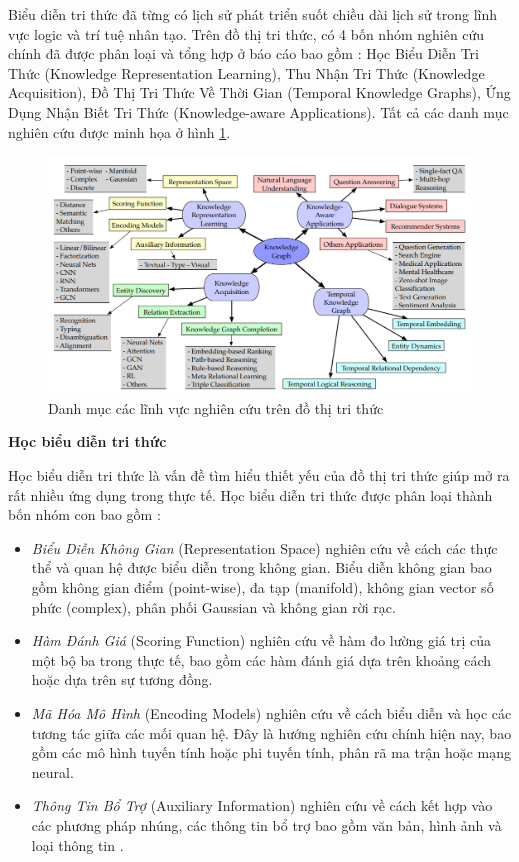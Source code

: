 Biểu diễn tri thức đã từng có lịch sử phát triển suốt chiều dài lịch sử trong lĩnh vực logic và trí tuệ nhân tạo. Trên đồ thị tri thức, có 4 bốn nhóm nghiên cứu chính đã được phân loại và tổng hợp ở báo cáo \cite{ji2020survey} bao gồm : Học Biểu Diễn Tri Thức (Knowledge Representation Learning), Thu Nhận Tri Thức (Knowledge Acquisition), Đồ Thị Tri Thức Về Thời Gian (Temporal Knowledge Graphs), Ứng Dụng Nhận Biết Tri Thức (Knowledge-aware Applications). Tất cả các danh mục nghiên cứu được minh họa ở hình \ref{fig:categoriesResearch}.

\begin{figure}[htp]
	\centering
	\includegraphics[width=\textwidth]{images/categories_research_knowledge_graph.png}
	\caption{
		Danh mục các lĩnh vực nghiên cứu trên đồ thị tri thức}
	\label{fig:categoriesResearch}
\end{figure}

\textbf{Học biểu diễn tri thức}

Học biểu diễn tri thức là vấn đề tìm hiểu thiết yếu của đồ thị tri thức giúp mở ra rất nhiều ứng dụng trong thực tế. Học biểu diễn tri thức được phân loại thành bốn nhóm con bao gồm : 

\begin{itemize}
	\item \textit{Biểu Diễn Không Gian} (Representation Space) nghiên cứu về cách các thực thể và quan hệ được biểu diễn trong không gian. Biểu diễn không gian bao gồm không gian điểm (point-wise), đa tạp (manifold), không gian vector số phức (complex), phân phối Gaussian và không gian rời rạc.
	
	\item \textit{Hàm Đánh Giá} (Scoring Function) nghiên cứu về hàm đo lường giá trị của một bộ ba trong thực tế, bao gồm các hàm đánh giá dựa trên khoảng cách hoặc dựa trên sự tương đồng.
	
	\item \textit{Mã Hóa Mô Hình} (Encoding Models) nghiên cứu về cách biểu diễn và học các tương tác giữa các mối quan hệ. Đây là hướng nghiên cứu chính hiện nay, bao gồm các mô hình tuyến tính hoặc phi tuyến tính, phân rã ma trận hoặc mạng neural.
	
	\item \textit{Thông Tin Bổ Trợ} (Auxiliary Information) nghiên cứu về cách kết hợp vào các phương pháp nhúng, các thông tin bổ trợ bao gồm văn bản, hình ảnh và loại thông tin .
\end{itemize}

